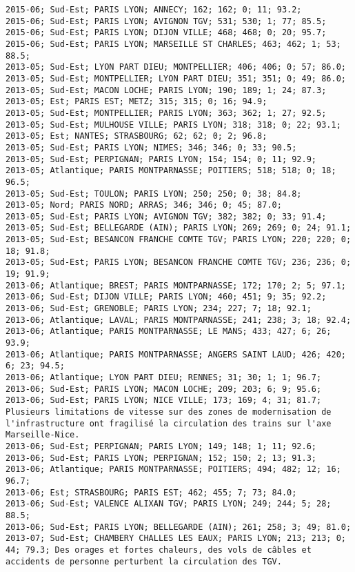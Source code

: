\documentclass{article}
\begin{document}
\begin{Verbatim}[commandchars=\\\{\}]
2015-06; Sud-Est; PARIS LYON; ANNECY; 162; 162; 0; 11; 93.2; 
2015-06; Sud-Est; PARIS LYON; AVIGNON TGV; 531; 530; 1; 77; 85.5; 
2015-06; Sud-Est; PARIS LYON; DIJON VILLE; 468; 468; 0; 20; 95.7; 
2015-06; Sud-Est; PARIS LYON; MARSEILLE ST CHARLES; 463; 462; 1; 53; 88.5; 
2013-05; Sud-Est; LYON PART DIEU; MONTPELLIER; 406; 406; 0; 57; 86.0; 
2013-05; Sud-Est; MONTPELLIER; LYON PART DIEU; 351; 351; 0; 49; 86.0; 
2013-05; Sud-Est; MACON LOCHE; PARIS LYON; 190; 189; 1; 24; 87.3; 
2013-05; Est; PARIS EST; METZ; 315; 315; 0; 16; 94.9; 
2013-05; Sud-Est; MONTPELLIER; PARIS LYON; 363; 362; 1; 27; 92.5; 
2013-05; Sud-Est; MULHOUSE VILLE; PARIS LYON; 318; 318; 0; 22; 93.1; 
2013-05; Est; NANTES; STRASBOURG; 62; 62; 0; 2; 96.8; 
2013-05; Sud-Est; PARIS LYON; NIMES; 346; 346; 0; 33; 90.5; 
2013-05; Sud-Est; PERPIGNAN; PARIS LYON; 154; 154; 0; 11; 92.9; 
2013-05; Atlantique; PARIS MONTPARNASSE; POITIERS; 518; 518; 0; 18; 96.5; 
2013-05; Sud-Est; TOULON; PARIS LYON; 250; 250; 0; 38; 84.8; 
2013-05; Nord; PARIS NORD; ARRAS; 346; 346; 0; 45; 87.0; 
2013-05; Sud-Est; PARIS LYON; AVIGNON TGV; 382; 382; 0; 33; 91.4; 
2013-05; Sud-Est; BELLEGARDE (AIN); PARIS LYON; 269; 269; 0; 24; 91.1; 
2013-05; Sud-Est; BESANCON FRANCHE COMTE TGV; PARIS LYON; 220; 220; 0; 18; 91.8; 
2013-05; Sud-Est; PARIS LYON; BESANCON FRANCHE COMTE TGV; 236; 236; 0; 19; 91.9; 
2013-06; Atlantique; BREST; PARIS MONTPARNASSE; 172; 170; 2; 5; 97.1; 
2013-06; Sud-Est; DIJON VILLE; PARIS LYON; 460; 451; 9; 35; 92.2; 
2013-06; Sud-Est; GRENOBLE; PARIS LYON; 234; 227; 7; 18; 92.1; 
2013-06; Atlantique; LAVAL; PARIS MONTPARNASSE; 241; 238; 3; 18; 92.4; 
2013-06; Atlantique; PARIS MONTPARNASSE; LE MANS; 433; 427; 6; 26; 93.9; 
2013-06; Atlantique; PARIS MONTPARNASSE; ANGERS SAINT LAUD; 426; 420; 6; 23; 94.5; 
2013-06; Atlantique; LYON PART DIEU; RENNES; 31; 30; 1; 1; 96.7; 
2013-06; Sud-Est; PARIS LYON; MACON LOCHE; 209; 203; 6; 9; 95.6; 
2013-06; Sud-Est; PARIS LYON; NICE VILLE; 173; 169; 4; 31; 81.7; Plusieurs limitations de vitesse sur des zones de modernisation de l'infrastructure ont fragilisé la circulation des trains sur l'axe Marseille-Nice.
2013-06; Sud-Est; PERPIGNAN; PARIS LYON; 149; 148; 1; 11; 92.6; 
2013-06; Sud-Est; PARIS LYON; PERPIGNAN; 152; 150; 2; 13; 91.3; 
2013-06; Atlantique; PARIS MONTPARNASSE; POITIERS; 494; 482; 12; 16; 96.7; 
2013-06; Est; STRASBOURG; PARIS EST; 462; 455; 7; 73; 84.0; 
2013-06; Sud-Est; VALENCE ALIXAN TGV; PARIS LYON; 249; 244; 5; 28; 88.5; 
2013-06; Sud-Est; PARIS LYON; BELLEGARDE (AIN); 261; 258; 3; 49; 81.0; 
2013-07; Sud-Est; CHAMBERY CHALLES LES EAUX; PARIS LYON; 213; 213; 0; 44; 79.3; Des orages et fortes chaleurs, des vols de câbles et accidents de personne perturbent la circulation des TGV.

\end{Verbatim}
\end{document}

